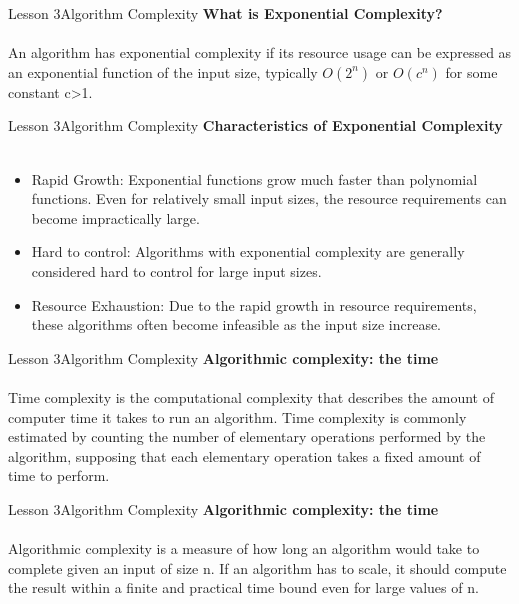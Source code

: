 \documentclass[aspectratio=1610]{beamer}
\begin{document}
\begin{frame}{Lesson 3}{Algorithm Complexity}
\LARGE
\textbf{What is Exponential Complexity?}\\~\\
An algorithm has exponential complexity if its resource usage can be expressed as
an exponential function of the input size, typically $O(2^n)$ or $O(c^n)$ for some
constant c>1.
\end{frame}



\begin{frame}{Lesson 3}{Algorithm Complexity}
\LARGE
\textbf{Characteristics of Exponential Complexity}\\~\\
\Large
\begin{itemize}
	\item Rapid Growth: Exponential functions grow much faster than polynomial functions. Even for relatively small input sizes, the resource requirements can become impractically large.
	\item Hard to control: Algorithms with exponential complexity are generally considered hard to control for large input sizes.	
    \item Resource Exhaustion: Due to the rapid growth in resource requirements, these algorithms often become infeasible as the input size increase.
\end{itemize}
\end{frame}




\begin{frame}{Lesson 3}{Algorithm Complexity}
\LARGE
\textbf{Algorithmic complexity: the time}\\~\\
Time complexity is the computational complexity that describes the
amount of computer time it takes to run an algorithm. Time
complexity is commonly estimated by counting the number of
elementary operations performed by the algorithm, supposing that
each elementary operation takes a fixed amount of time to perform.
\end{frame}

\begin{frame}{Lesson 3}{Algorithm Complexity}
\LARGE
\textbf{Algorithmic complexity: the time}\\~\\
Algorithmic complexity is a measure of how long an algorithm would take to 
complete given an input of size n. If an algorithm has to scale, it should 
compute the result within a finite and practical time bound even for 
large values of n.
\end{frame}
\end{document}
